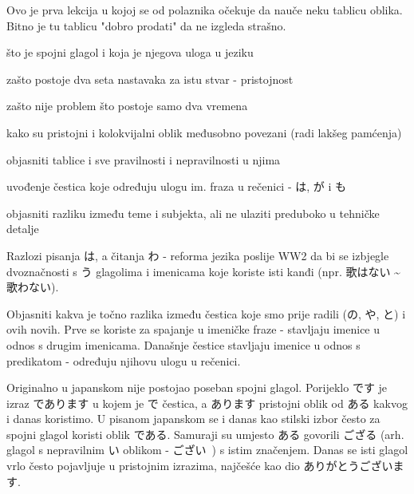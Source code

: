 
\author{Tomislav Mamić}

	
	Ovo je prva lekcija u kojoj se od polaznika očekuje da nauče neku tablicu oblika. Bitno je tu tablicu "dobro prodati" da ne izgleda strašno.
	
	
	\begin{hyou}
		\item što je spojni glagol i koja je njegova uloga u jeziku
		\item zašto postoje dva seta nastavaka za istu stvar - pristojnost
		\item zašto nije problem što postoje samo dva vremena
		\item kako su pristojni i kolokvijalni oblik međusobno povezani (radi lakšeg pamćenja)
		\item objasniti tablice i sve pravilnosti i nepravilnosti u njima
		\item uvođenje čestica koje određuju ulogu im. fraza u rečenici - は, が i も
		\item objasniti razliku između teme i subjekta, ali ne ulaziti preduboko u tehničke detalje
	\end{hyou}

	
	\begin{hyou}
		\item Razlozi pisanja は, a čitanja わ - reforma jezika poslije WW2 da bi se izbjegle dvoznačnosti s う glagolima i imenicama koje koriste isti kanđi (npr. 歌はない \textasciitilde 歌わない).
		\item Objasniti kakva je točno razlika između čestica koje smo prije radili (の, や, と) i ovih novih. Prve se koriste za spajanje u imeničke fraze - stavljaju imenice u odnos s drugim imenicama. Današnje čestice stavljaju imenice u odnos s predikatom - određuju njihovu ulogu u rečenici.
	\end{hyou}
	
	
	Originalno u japanskom nije postojao poseban spojni glagol. Porijeklo です je izraz であります u kojem je で čestica, a あります pristojni oblik od ある kakvog i danas koristimo. U pisanom japanskom se i danas kao stilski izbor često za spojni glagol koristi oblik である. Samuraji su umjesto ある govorili ござる (arh. glagol s nepravilnim い oblikom - ござい~) s istim značenjem. Danas se isti glagol vrlo često pojavljuje u pristojnim izrazima, najčešće kao dio ありがとうございます.
